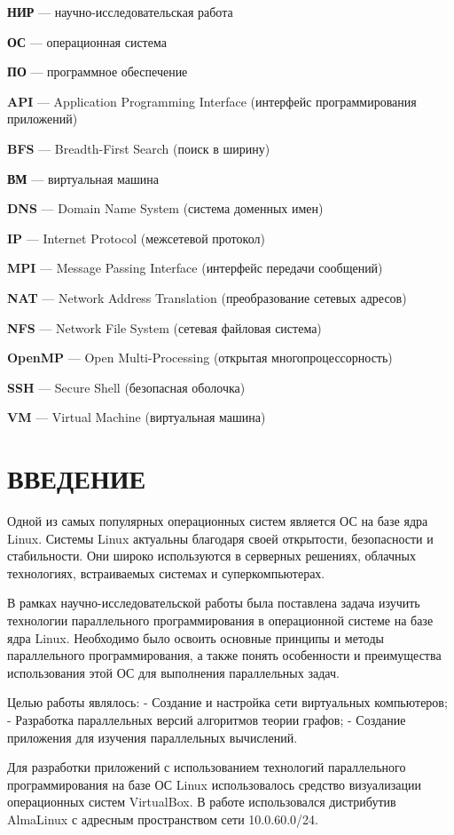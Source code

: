 \documentclass[11pt,a4paper,final]{article}
\begin{document}
\textbf{НИР} — научно-исследовательская работа

\textbf{ОС} — операционная система

\textbf{ПО} — программное обеспечение

\textbf{API} — Application Programming Interface (интерфейс программирования приложений)

\textbf{BFS} — Breadth-First Search (поиск в ширину)

\textbf{ВМ} — виртуальная машина

\textbf{DNS} — Domain Name System (система доменных имен)

\textbf{IP} — Internet Protocol (межсетевой протокол)

\textbf{MPI} — Message Passing Interface (интерфейс передачи сообщений)

\textbf{NAT} — Network Address Translation (преобразование сетевых адресов)

\textbf{NFS} — Network File System (сетевая файловая система)

\textbf{OpenMP} — Open Multi-Processing (открытая многопроцессорность)

\textbf{SSH} — Secure Shell (безопасная оболочка)

\textbf{VM} — Virtual Machine (виртуальная машина)

\newpage
\section*{ВВЕДЕНИЕ}

Одной из самых популярных операционных систем является ОС на базе ядра Linux. Системы Linux актуальны благодаря своей открытости, безопасности и стабильности. Они широко используются в серверных решениях, облачных технологиях, встраиваемых системах и суперкомпьютерах. 

В рамках научно-исследовательской работы была поставлена задача изучить технологии параллельного программирования в операционной системе на базе ядра Linux. Необходимо было освоить основные принципы и методы параллельного программирования, а также понять особенности и преимущества использования этой ОС для выполнения параллельных задач.

Целью работы являлось:
- Создание и настройка сети виртуальных компьютеров;
- Разработка параллельных версий алгоритмов теории графов;
- Создание приложения для изучения параллельных вычислений.

Для разработки приложений с использованием технологий параллельного программирования на базе ОС Linux использовалось средство визуализации операционных систем VirtualBox. В работе использовался дистрибутив AlmaLinux с адресным пространством сети 10.0.60.0/24.
\end{document}
